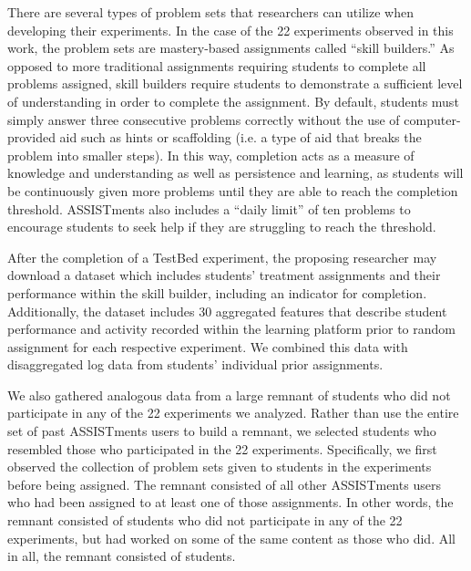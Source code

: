 There are several types of problem sets that researchers can
utilize when developing their experiments. In the case of the 22
experiments observed in this work, the problem sets are
mastery-based assignments called “skill builders.” As opposed to
more traditional assignments requiring students to complete all
problems assigned, skill builders require students to demonstrate
a sufficient level of understanding in order to complete the
assignment. By default, students must simply answer three
consecutive problems correctly without the use of
computer-provided aid such as hints or scaffolding (i.e. a type of
aid that breaks the problem into smaller steps).
In this way,
completion acts as a measure of knowledge and understanding as
well as persistence and learning, as students will be continuously
given more problems until they are able to reach the completion
threshold.
ASSISTments also includes a “daily limit” of ten
problems to encourage students to seek help if they are struggling
to reach the threshold.

After the completion of a TestBed experiment, the proposing researcher
may download a dataset which includes students' treatment assignments
and their performance within the skill builder, including an indicator
for completion.
Additionally, the dataset includes 30 aggregated features that
describe student performance and activity recorded within the
learning platform prior to random assignment for each respective
experiment.
We combined this data with disaggregated log data from students'
individual prior assignments.

We also gathered analogous data from a large remnant of students who
did not participate in any of the 22 experiments we analyzed.
Rather than use the entire set of past ASSISTments users to build a
remnant, we selected students who resembled those who participated in
the 22 experiments.
Specifically, we first observed the collection of problem sets given
to students in the experiments before being assigned.
The remnant consisted of all other ASSISTments users who had been
assigned to at least one of those assignments.
In other words, the remnant consisted of students who did not
participate in any of the 22 experiments, but had worked on some of
the same content as those who did.
All in all, the remnant consisted of  students.


